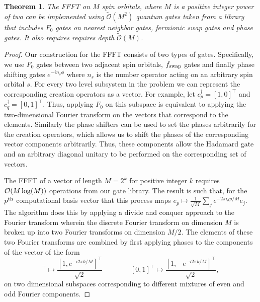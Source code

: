 \documentclass[superscriptaddress,aps,pra,nofootinbib,notitlepage,10pt,longbibliography]{revtex4-1}
\newtheorem{theorem}{Theorem}
\begin{document}
\begin{theorem}\label{thm:ffft}
The {\rm FFFT} on $M$ spin orbitals, where $M$ is a positive integer power of two can be implemented using $\widetilde{\mathcal{O}}(M^2)$ quantum gates taken from a library that includes $F_0$ gates on nearest neighbor gates, fermionic swap gates and phase gates.  It also requires requires depth $\widetilde{\mathcal{O}}(M)$.
\end{theorem}
\begin{proof}
Our construction for the FFFT consists of two types of gates.  Specifically, we use $F_0$ gates between two adjacent spin orbitals, $f_{\rm swap}$ gates and finally phase shifting gates $e^{-i n_s \phi}$ where $n_s$ is the number operator acting on an arbitrary spin orbital $s$.  For every two level subsystem in the problem we can represent the corresponding creation operators as a vector.  For example, let $c^\dagger_p = [1,0]^\top$ and $c_q^\dagger = [0,1]^\top$.  Thus, applying $F_0$ on this subspace is equivalent to applying the two-dimensional Fourier transform on the vectors that correspond to the elements.  Similarly the phase shifters can be used to set the phases arbitrarily for the creation operators, which allows us to shift the phases of the corresponding vector components arbitrarily.  Thus, these components allow the Hadamard gate and an arbitrary diagonal unitary to be performed on the corresponding set of vectors.

The FFFT of a vector of length $M=2^k$ for positive integer $k$ requires ${\cal O}(M\log(M))$ operations from our gate library. The result is such that, for the $p^{\rm th}$ computational basis vector that this process maps $e_p \mapsto \frac{1}{\sqrt{M}} \sum_j e^{-2\pi i jp/M}e_j$. The algorithm does this by applying a divide and conquer approach to the Fourier transform wherein the discrete Fourier transform on dimension $M$ is broken up into two Fourier transforms on dimension $M/2$.  The elements of these two Fourier transforms are combined by first applying phases to the components of the vector of the form
\begin{equation}
[1,0]^\top\mapsto \frac{[1,e^{-i2\pi k/M}]^\top}{\sqrt{2}}\qquad\qquad [0,1]^\top\mapsto \frac{[1,-e^{-i2\pi k/M}]^\top}{\sqrt{2}},\label{eq:vectrans}
\end{equation}
on two dimensional subspaces corresponding to different mixtures of even and odd Fourier components.


\end{proof}
\end{document}
